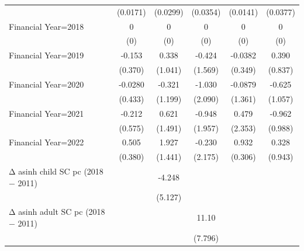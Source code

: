\begin{table}[htbp]
\begin{tabular}{l*{5}{c}}
                    &    (0.0171)         &    (0.0299)         &    (0.0354)         &    (0.0141)         &    (0.0377)         \\
\addlinespace
Financial Year=2018 &           0         &           0         &           0         &           0         &           0         \\
                    &         (0)         &         (0)         &         (0)         &         (0)         &         (0)         \\
\addlinespace
Financial Year=2019 &      -0.153         &       0.338         &      -0.424         &     -0.0382         &       0.390         \\
                    &     (0.370)         &     (1.041)         &     (1.569)         &     (0.349)         &     (0.837)         \\
\addlinespace
Financial Year=2020 &     -0.0280         &      -0.321         &      -1.030         &     -0.0879         &      -0.625         \\
                    &     (0.433)         &     (1.199)         &     (2.090)         &     (1.361)         &     (1.057)         \\
\addlinespace
Financial Year=2021 &      -0.212         &       0.621         &      -0.948         &       0.479         &      -0.962         \\
                    &     (0.575)         &     (1.491)         &     (1.957)         &     (2.353)         &     (0.988)         \\
\addlinespace
Financial Year=2022 &       0.505         &       1.927         &      -0.230         &       0.932\sym{***}&       0.328         \\
                    &     (0.380)         &     (1.441)         &     (2.175)         &     (0.306)         &     (0.943)         \\
\addlinespace
Δ asinh child SC pc (2018 − 2011)&                     &      -4.248         &                     &                     &                     \\
                    &                     &     (5.127)         &                     &                     &                     \\
\addlinespace
Δ asinh adult SC pc (2018 − 2011)&                     &                     &       11.10         &                     &                     \\
                    &                     &                     &     (7.796)         &                     &                     \\

\end{tabular}
\end{table}
